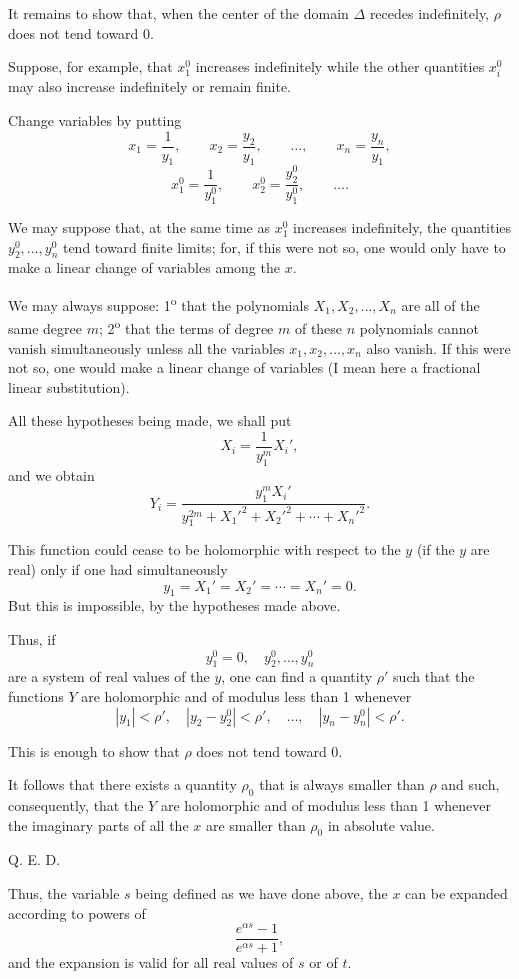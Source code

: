 \documentclass[11pt]{article}
\begin{document}
It remains to show that, when the center of the domain $\Delta$ recedes indefinitely, $\rho$ does not tend toward 0.

Suppose, for example, that $x_1^0$ increases indefinitely while the other quantities $x_i^0$ may also increase indefinitely or remain finite.

Change variables by putting
\[
x_1=\frac1{y_1},\qquad x_2=\frac{y_2}{y_1},\qquad \ldots,
\qquad x_n=\frac{y_n}{y_1},
\]
\[
x_1^0=\frac1{y_1^0},\qquad x_2^0=\frac{y_2^0}{y_1^0},\qquad \ldots.
\]

We may suppose that, at the same time as $x_1^0$ increases indefinitely, the quantities $y_2^0,\ldots,y_n^0$ tend toward finite limits; for, if this were not so, one would only have to make a linear change of variables among the $x$.

We may always suppose: 1\textsuperscript{o} that the polynomials $X_1,X_2,\ldots,X_n$ are all of the same degree $m$; 2\textsuperscript{o} that the terms of degree $m$ of these $n$ polynomials cannot vanish simultaneously unless all the variables $x_1,x_2,\ldots,x_n$ also vanish. If this were not so, one would make a linear change of variables (I mean here a fractional linear substitution).

All these hypotheses being made, we shall put
\[
X_i=\frac{1}{y_1^m}X_i',
\]
and we obtain
\[
Y_i=\frac{y_1^m X_i'}{y_1^{2m}+X_1'^2+X_2'^2+\cdots+X_n'^2}.
\]

This function could cease to be holomorphic with respect to the $y$ (if the $y$ are real) only if one had simultaneously
\[
y_1=X_1'=X_2'=\cdots=X_n'=0.
\]
But this is impossible, by the hypotheses made above.

Thus, if
\[
y_1^0=0,
\quad y_2^0,\ldots,y_n^0
\]
are a system of real values of the $y$, one can find a quantity $\rho'$ such that the functions $Y$ are holomorphic and of modulus less than 1 whenever
\[
|y_1|<\rho',\quad |y_2-y_2^0|<\rho',\quad \ldots,
\quad |y_n-y_n^0|<\rho'.
\]

This is enough to show that $\rho$ does not tend toward 0.

It follows that there exists a quantity $\rho_0$ that is always smaller than $\rho$ and such, consequently, that the $Y$ are holomorphic and of modulus less than 1 whenever the imaginary parts of all the $x$ are smaller than $\rho_0$ in absolute value. \begin{flushright}Q. E. D.\end{flushright}

Thus, the variable $s$ being defined as we have done above, the $x$ can be expanded according to powers of
\[
\frac{e^{\alpha s}-1}{e^{\alpha s}+1},
\]
and the expansion is valid for all real values of $s$ or of $t$.
\end{document}
